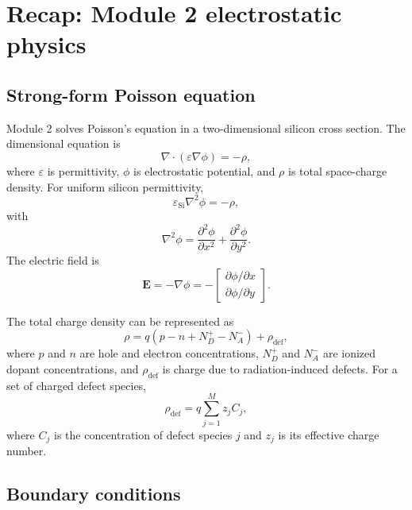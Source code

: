 \documentclass[11pt]{article}
\newcommand{\Evec}{\mathbf{E}}
\newcommand{\rhodef}{\rho_{\mathrm{def}}}
\newcommand{\epss}{\varepsilon_{\mathrm{Si}}}
\begin{document}
\section{Recap: Module 2 electrostatic physics}

\subsection{Strong-form Poisson equation}

Module 2 solves Poisson's equation in a two-dimensional silicon cross section. The dimensional equation is
\begin{equation}
\nabla\cdot\left(\varepsilon \nabla \phi\right) = -\rho,
\label{eq:poisson_general}
\end{equation}
where $\varepsilon$ is permittivity, $\phi$ is electrostatic potential, and $\rho$ is total space-charge density. For uniform silicon permittivity,
\begin{equation}
\epss \nabla^2 \phi = -\rho,
\label{eq:poisson_constant_eps}
\end{equation}
with
\begin{equation}
\nabla^2\phi=\frac{\partial^2\phi}{\partial x^2}+\frac{\partial^2\phi}{\partial y^2}.
\end{equation}
The electric field is
\begin{equation}
\Evec=-\nabla\phi
= -\begin{bmatrix}
\partial \phi/\partial x \\
\partial \phi/\partial y
\end{bmatrix}.
\label{eq:e_field_definition}
\end{equation}

The total charge density can be represented as
\begin{equation}
\rho=q\left(p-n+N_D^+-N_A^-\right)+\rhodef,
\label{eq:total_charge}
\end{equation}
where $p$ and $n$ are hole and electron concentrations, $N_D^+$ and $N_A^-$ are ionized dopant concentrations, and $\rhodef$ is charge due to radiation-induced defects. For a set of charged defect species,
\begin{equation}
\rhodef=q\sum_{j=1}^{M}z_j C_j,
\label{eq:defect_charge_density}
\end{equation}
where $C_j$ is the concentration of defect species $j$ and $z_j$ is its effective charge number.

\subsection{Boundary conditions}
\end{document}
